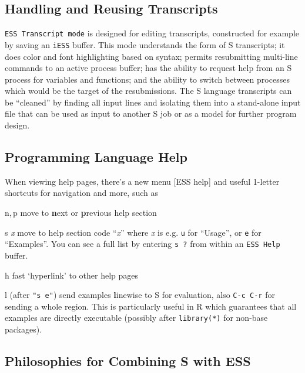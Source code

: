\documentclass{article}
\newcommand{\stexttt}[1]{{\small\texttt{#1}}}
\begin{document}
\subsection{Handling and Reusing Transcripts}
\label{sec:S:trans}

\stexttt{ESS Transcript mode} is designed
for editing transcripts, constructed for example by saving
an \stexttt{iESS} buffer.  This mode understands the form of S
transcripts; it does color and font highlighting based on syntax; permits 
resubmitting
multi-line commands to an active process buffer; has the ability to
request help from an S process for variables and functions; and the ability to
switch between processes which would be the target of the resubmissions.
The S language transcripts can be ``cleaned'' by
finding all input lines and isolating them into a stand-alone input file
that can be used as input to another S job or as a model for further
program design.

\subsection{Programming Language Help}
\label{sec:S:help}

When viewing help pages, there's a new menu \textsf{[ESS help]} and
useful 1-letter shortcuts for navigation and more, such as
\begin{list}{}{\renewcommand{\makelabel}[1]{\bf#1\hfill}}
\item[n,\,p] move to \textbf{n}ext or \textbf{p}revious help section
\item[{s \textit{x}}] move to help section code ``\textit{x}'' where
  \textit{x} is e.g. \stexttt{u} for ``Usage'', or \stexttt{e} for
  ``Examples''.  You can see a full list by entering \stexttt{s ?} from within
an \stexttt{ESS Help} buffer.
\item[h] fast `hyperlink' to other help pages
\item[l] (after \stexttt{"s e"}) send examples \textbf{l}inewise to S for
  evaluation, also \stexttt{C-c C-r} for sending a whole region.  This 
  is particularly useful in R which guarantees that all examples are
  directly executable (possibly after \stexttt{library(*)} for non-base
  packages).
\end{list}

\subsection{Philosophies for Combining S with ESS}
\label{sec:S:philosophy}
\end{document}
